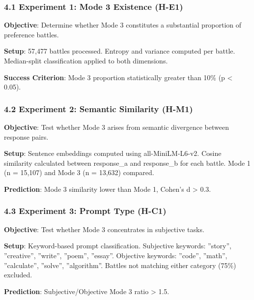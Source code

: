 
\subsubsection{4.1 Experiment 1: Mode 3 Existence (H-E1)}

\textbf{Objective}: Determine whether Mode 3 constitutes a substantial proportion of preference battles.

\textbf{Setup}: 57,477 battles processed. Entropy and variance computed per battle. Median-split classification applied to both dimensions.

\textbf{Success Criterion}: Mode 3 proportion statistically greater than 10\% (p < 0.05).

\subsubsection{4.2 Experiment 2: Semantic Similarity (H-M1)}

\textbf{Objective}: Test whether Mode 3 arises from semantic divergence between response pairs.

\textbf{Setup}: Sentence embeddings computed using all-MiniLM-L6-v2. Cosine similarity calculated between response\_a and response\_b for each battle. Mode 1 (n = 15,107) and Mode 3 (n = 13,632) compared.

\textbf{Prediction}: Mode 3 similarity lower than Mode 1, Cohen's d > 0.3.

\subsubsection{4.3 Experiment 3: Prompt Type (H-C1)}

\textbf{Objective}: Test whether Mode 3 concentrates in subjective tasks.

\textbf{Setup}: Keyword-based prompt classification. Subjective keywords: ''story'', ''creative'', ''write'', ''poem'', ''essay''. Objective keywords: ''code'', ''math'', ''calculate'', ''solve'', ''algorithm''. Battles not matching either category (75\%) excluded.

\textbf{Prediction}: Subjective/Objective Mode 3 ratio > 1.5.
